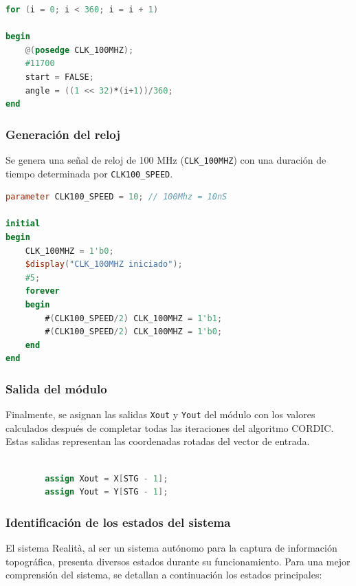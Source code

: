 \documentclass[12pt,a4paper, twoside]{article} %
\begin{document}
\begin{lstlisting}[language=Verilog]
for (i = 0; i < 360; i = i + 1)  

begin
    @(posedge CLK_100MHZ);
    #11700
    start = FALSE;
    angle = ((1 << 32)*(i+1))/360;
end
\end{lstlisting}

\subsubsection{Generación del reloj}
Se genera una señal de reloj de 100 MHz (\texttt{CLK\_100MHZ}) con una duración de tiempo determinada por \texttt{CLK100\_SPEED}.

\begin{lstlisting}[language=Verilog]
parameter CLK100_SPEED = 10; // 100Mhz = 10nS

initial
begin
    CLK_100MHZ = 1'b0;
    $display("CLK_100MHZ iniciado");
    #5;
    forever
    begin
        #(CLK100_SPEED/2) CLK_100MHZ = 1'b1;
        #(CLK100_SPEED/2) CLK_100MHZ = 1'b0;
    end
end
\end{lstlisting}


\subsubsection{Salida del módulo}

Finalmente, se asignan las salidas \texttt{Xout} y \texttt{Yout} del módulo con los valores calculados después de completar todas las iteraciones del algoritmo CORDIC. Estas salidas representan las coordenadas rotadas del vector de entrada.

\begin{lstlisting}[language=Verilog]

        assign Xout = X[STG - 1];
        assign Yout = Y[STG - 1];

\end{lstlisting}



\subsubsection{Identificación de los estados del sistema}
\label{sec:orgdaca22c}

El sistema Realità, al ser un sistema autónomo para la captura de información topográfica, presenta diversos estados durante su funcionamiento. Para una mejor comprensión del sistema, se detallan a continuación los estados principales:
\end{document}
